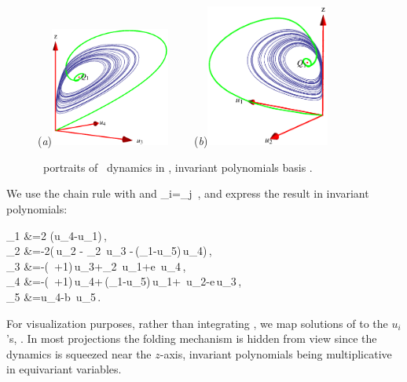 \begin{figure}[ht]
\begin{center}
  (\textit{a})\includegraphics[width=0.35\textwidth]{../figs/CLEip1}
~~~~(\textit{b})\includegraphics[width=0.36\textwidth]{../figs/CLEip2}
\end{center}
\caption{
\Statesp\ portraits of \cLe\ dynamics in \reducedsp,
invariant polynomials basis .
    }
\label{fig:CLEip}
\end{figure}


We use the chain rule with  and 
\beq
 _i=_j
 \,,
and express the result in invariant polynomials:
    \
\beq
\begin{split}
  _1 &=2\,\sigma\,(u_4-u_1)\,,\\
  _2 &=-2\left(\,u_2 - \rho_2\, u_3 -\,(\rho_1-u_5)\,u_4\right)\,,\\
  _3 &=-(\sigma\, +1)\,u_3+\rho_2\, u_1+e\, u_4\,,\\
  _4 &=-(\sigma\, +1)\,u_4+\,(\rho_1-u_5)\,u_1+\sigma\, u_2-e\,u_3\,,\\
  \dot{u}_5 &=u_4-b\, u_5\,.
\end{split}
\label{eq:CLEip}
\eeq
For visualization purposes, rather than integrating
, we map solutions of  to the
$u_i$'s, . In most projections the folding
mechanism is hidden from view since the dynamics is squeezed
near the $z$-axis, invariant polynomials being multiplicative
in equivariant variables.

